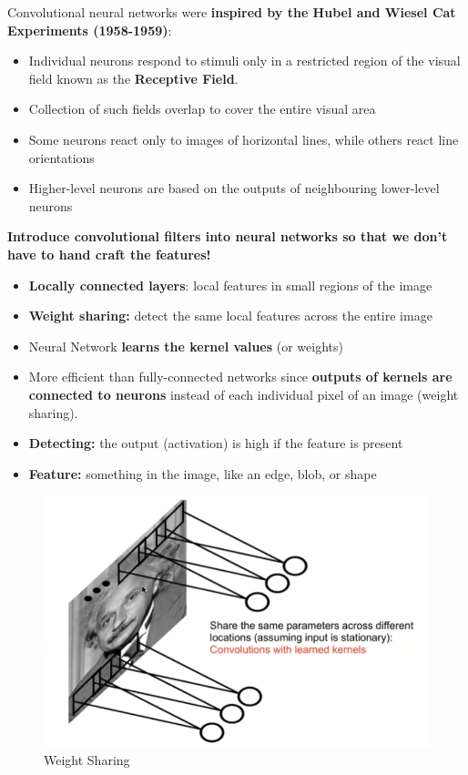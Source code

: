 Convolutional neural networks were\textbf{ inspired by the Hubel and Wiesel Cat Experiments (1958-1959)}:
\begin{itemize}
    \item Individual neurons respond to stimuli only in a restricted region of the visual field
known as the \textbf{Receptive Field}.
\item Collection of such fields overlap to cover the entire visual area
\item Some neurons react only to images of horizontal lines, while others react line
orientations
\item Higher-level neurons are based on the outputs of neighbouring lower-level
neurons


\end{itemize}

\textbf{Introduce convolutional filters into neural networks so that we don’t have to hand
craft the features!}
\begin{itemize}
    \item \textbf{Locally connected layers}: local features in small regions of the image
    \item \textbf{Weight sharing:} detect the same local features across the entire image
    \item Neural Network \textbf{learns the kernel values} (or weights)
    \item More efficient than fully-connected networks since \textbf{outputs of kernels are connected to neurons} instead of each individual pixel of an image (weight sharing). 
    \item \textbf{Detecting:} the output (activation) is high if the feature is present
    \item \textbf{Feature:} something in the image, like an edge, blob, or shape
    

\end{itemize}

\begin{figure}[h!t]
    \centering
    \includegraphics[width=0.3\linewidth]{weightsharing.png}
    \caption{Weight Sharing}
    \label{fig:enter-label}
\end{figure}



